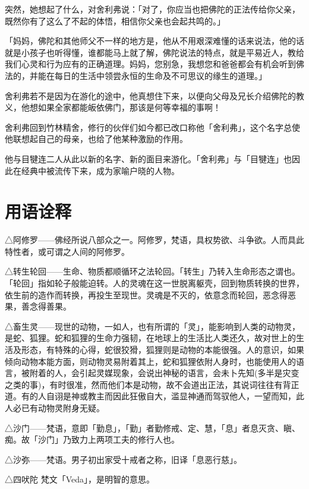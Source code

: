 \documentclass[12pt,twoside,openany]{book}
\begin{document}
突然，她想起了什么，对舍利弗说：「对了，你应当也把佛陀的正法传给你父亲，既然你有了这么了不起的体悟，相信你父亲也会起共鸣的。」

「妈妈，佛陀和其他师父不一样的地方是，他从不用艰深难懂的话来说法，他的话就是小孩子也听得懂，谁都能马上就了解，佛陀说法的特点，就是平易近人，教给我们心灵和行为应有的正确道理。妈妈，您别急，我想您和爸爸都会有机会听到佛法的，并能在每日的生活中领尝永恒的生命及不可思议的缘生的道理。」

舍利弗若不是因为在游化的途中，他真想住下来，以便向父母及兄长介绍佛陀的教义，他想如果全家都能皈依佛门，那该是何等幸福的事啊！

舍利弗回到竹林精舍，修行的伙伴们如今都已改口称他「舍利弗」，这个名字总使他联想起自己的母亲，也给了他某种激励的作用。

他与目犍连二人从此以新的名字、新的面目来游化。「舍利弗」与「目犍连」也因此在经典中被流传下来，成为家喻户晓的人物。





\chapter*{用语诠释}

△阿修罗——佛经所说八部众之一。阿修罗，梵语，具权势欲、斗争欲。人而具此特性者，或可谓之人间的阿修罗。

△转生轮回——生命、物质都顺循环之法轮回。「转生」乃转入生命形态之谓也。「轮回」指如轮子般能迫转。人的灵魂在这一世脱离躯壳，回到物质转换的世界，依生前的造作而转换，再投生至现世。灵魂是不灭的，依意念而轮回，恶念得恶果，善念得善果。

△畜生灵——现世的动物，一如人，也有所谓的「灵」，能影响到人类的动物灵，是蛇、狐狸。蛇和狐狸的生命力强韧，在地球上的生活比人类还久，故对世上的生活及形态，有特殊的心得，蛇很狡猾，狐狸则是动物的本能很强。人的意识，如果倾向动物本能方面，则动物灵易附着其上，蛇和狐狸依附人身时，也能使用人的语言，被附着的人，会引起灵媒现象，会说出神秘的语言，会未卜先知(多半是灾变之类的事)，有时很准，然而他们本是动物，故不会道出正法，其说词往往有背正道。有的人自诩是神或教主而因此狂傲自大，滥显神通而驾驭他人，一望而知，此人必已有动物灵附身无疑。

△沙门——梵语，意即「勤息」，「勤」者勤修戒、定、慧，「息」者息灭贪、瞋、痴。故「沙门」乃致力上两项工夫的修行人也。

△沙弥——梵语。男子初出家受十戒者之称，旧译「息恶行慈」。

△四吠陀	梵文「Veda」，是明智的意思。
\end{document}
